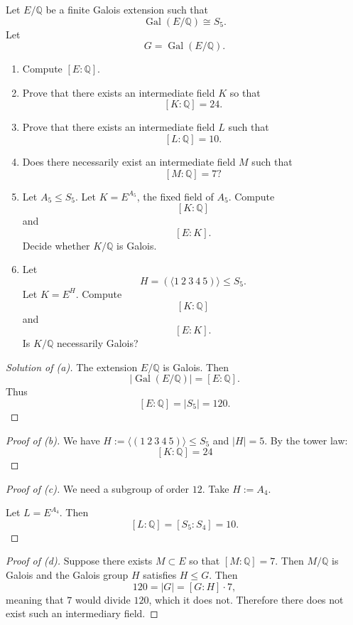 \begin{prob}
    Let $E / \mathbb Q$ be a finite Galois extension such 
    that 
    \[
        \operatorname{Gal}(E/\mathbb Q) \cong S_5. 
    \]
    Let 
    \[
        G = \operatorname{Gal}(E/\mathbb Q).
    \]
    \begin{enumerate}
        \item Compute $[E:\mathbb Q]$.
        \item Prove that there exists an 
            intermediate field $K$ so that 
            \[
                [K : \mathbb Q] = 24. 
            \]
        \item Prove that there exists an intermediate 
            field $L$ such that  
            \[
                [L : \mathbb Q] = 10.
            \]
        \item Does there necessarily exist an intermediate field 
            $M$ such that 
            \[
                [M : \mathbb Q] = 7? 
            \]
        \item Let $A_5 \leq S_5$. Let $K = E^{A_5}$, the fixed 
            field of $A_5$.
            Compute 
            \[
                [K : \mathbb Q]
            \]
            and 
            \[
                [E:K].
            \]  
            Decide whether $K / \mathbb Q$ is Galois.
        \item Let 
            \[
                H = (\langle 1 \ 2 \ 3 \ 4 \ 5 )\rangle \leq S_5. 
            \]
            Let $K = E^H$. 
            Compute 
            \[
                [K : \mathbb Q]
            \]
            and 
            \[
                [E : K].
            \]
            Is $K / \mathbb Q$ necessarily Galois?
    \end{enumerate}
\end{prob}
\begin{proof}[Solution of (a)]
    The extension $E/\mathbb Q$ is Galois. 
    Then 
    \[
        |\operatorname{Gal}(E/\mathbb Q)| = 
        [E : \mathbb Q]. 
    \]
    Thus 
    \[
        [E : \mathbb Q] 
        = |S_5| = 120.
    \]
\end{proof}
\begin{proof}[Proof of (b)]
    We have $H:=\langle (1 \ 2 \ 3 \ 4 \ 5)\rangle \leq S_5$ and 
    $|H| = 5$. By the tower law: 
    \[
        [K : \mathbb Q] = 24
    \]
\end{proof}
\begin{proof}[Proof of (c)]
    We need a subgroup of order $12$. 
    Take $H := A_4$.

    Let $L = E^{A_4}$. Then 
    \[
        [L :\mathbb Q] = [S_5 : S_4] = 10.
    \]
\end{proof}
\begin{proof}[Proof of (d)]
    Suppose there exists 
    $M \subset E$ so that 
    $[M : \mathbb Q] = 7$. Then 
    $M / \mathbb Q$ is Galois and the 
    Galois group $H$ satisfies 
    $H \leq G$. Then 
    \[
        120 = |G| = [G : H] \cdot 7,
    \]
    meaning that $7$ would divide 
    $120$, which it does not. 
    Therefore there does not exist such an 
    intermediary field. 
\end{proof}


